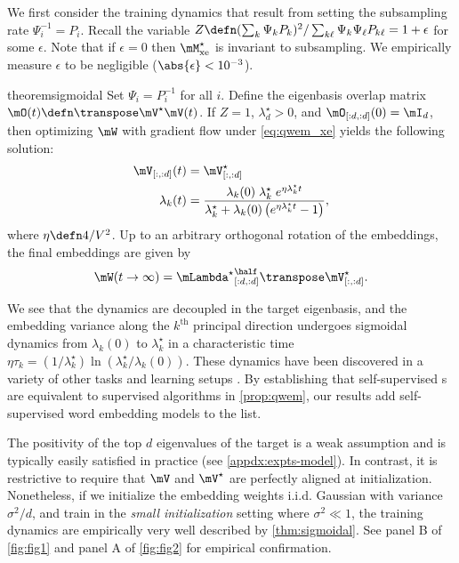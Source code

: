 \newpage

We first consider the training dynamics that result from setting the subsampling rate $\Psi_i^{-1} = P_i$. Recall the variable $Z\defn(\sum_k\Psi_kP_k)^2/\sum_{k\ell} \Psi_k \Psi_\ell P_{k\ell}=1+\epsilon$ for some $\epsilon$. Note that if $\epsilon=0$ then $\Mstarxe$ is invariant to subsampling. We empirically measure $\epsilon$ to be negligible ($\abs{\epsilon}<10^{-3}$).

\begin{restatable}{theorem}{sigmoidal}
    \label{thm:sigmoidal}
    Set $\Psi_i = P_i^{-1}$ for all $i$. Define the eigenbasis overlap matrix $\O(t)\defn \T{\mV^\star}\mV(t)$. If $Z=1$, $\lambda^\star_d > 0$, and $\O_{[:d,:d]}(0)=\mI_d$, then optimizing $\mW$ with gradient flow under \cref{eq:qwem_xe} yields the following solution:    
    \begin{align}
        \mV_{[:,:d]}(t) &= \mV_{[:,:d]}^\star\\
        \lambda_k(t) &= \frac{\lambda_k(0) \; \lambda_k^\star \; e^{\eta\lambda_k^\star t}}{\lambda_k^\star + \lambda_k(0)\left(e^{\eta\lambda_k^\star t} -1\right)},
    \end{align}
    where $\eta\defn 4/V^2$. Up to an arbitrary orthogonal rotation of the embeddings, the final embeddings are given by
    \begin{equation}
        \mW(t\to\infty) = {\Lstar}_{[:d,:d]}^\half \T{\mV_{[:,:d]}^\star}.
    \end{equation}
\end{restatable}
We see that the dynamics are decoupled in the target eigenbasis, and the embedding variance along the $k^\mathrm{th}$ principal direction undergoes sigmoidal dynamics from $\lambda_k(0)$ to $\lambda^\star_k$ in a characteristic time
$\eta\tau_k=(1/\lambda^\star_k)\ln(\lambda^\star_k / \lambda_k(0))$. These dynamics have been discovered in a variety of other tasks and learning setups \citep{saxe2014exact,gidel2019implicit,atanasov2022neural,simon2023stepwise}. By establishing that self-supervised \wem s are equivalent to supervised algorithms in \cref{prop:qwem}, our results add self-supervised word embedding models to the list.

The positivity of the top $d$ eigenvalues of the target is a weak assumption and is typically easily satisfied in practice (see \cref{appdx:expts-model}). In contrast, it is restrictive to require that $\mV$ and $\mV^\star$ are perfectly aligned at initialization. Nonetheless, if we initialize the embedding weights i.i.d. Gaussian with variance $\sigma^2/d$, and train in the \textit{small initialization} setting where $\sigma^2\ll 1$, the training dynamics are empirically very well described by \cref{thm:sigmoidal}. 
See panel B of \cref{fig:fig1} and panel A of \cref{fig:fig2} for empirical confirmation.

